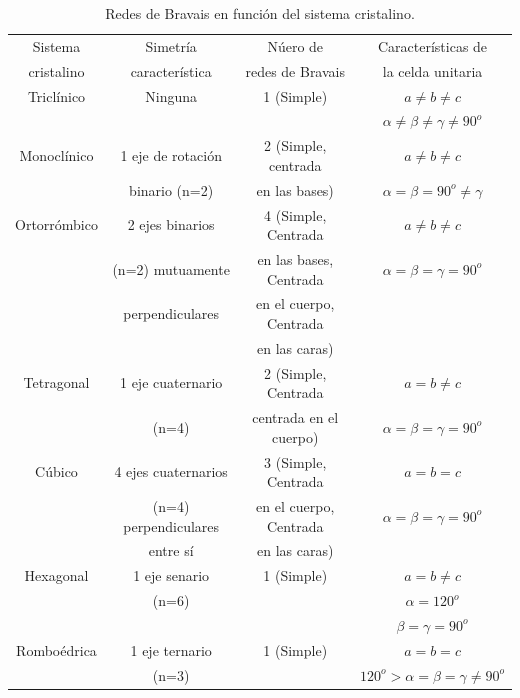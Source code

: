 \begin{table}[h!] \centering
    \begin{tabular}{cccc}
        Sistema  & Simetría  & Núero de & Características de \\ 
        cristalino & característica & redes de Bravais & la celda unitaria \\
        \hline \hline 
        Triclínico & Ninguna & 1 (Simple) & $a \neq b \neq c$ \\
        & & & $\alpha \neq \beta \neq \gamma \neq 90^o$ \\ \hline
        Monoclínico & 1 eje de rotación & 2 (Simple, centrada & $a \neq b \neq c$ \\
        & binario (n=2) & en las bases) & $\alpha = \beta = 90^o \neq \gamma$ \\ \hline Ortorrómbico & 2 ejes binarios & 4 (Simple, Centrada & $a \neq b \neq c$ \\
        & (n=2) mutuamente & en las bases, Centrada & $ \alpha = \beta = \gamma = 90^o$ \\
        & perpendiculares & en el cuerpo, Centrada & \\
        & & en las caras) & \\ \hline
        Tetragonal  & 1 eje cuaternario & 2 (Simple, Centrada & $a=b\neq c$ \\
        & (n=4) & centrada en el cuerpo) & $ \alpha = \beta = \gamma = 90^o$ \\ \hline
        Cúbico & 4 ejes cuaternarios & 3 (Simple, Centrada & $a=b=c$ \\
        & (n=4) perpendiculares & en el cuerpo, Centrada & $ \alpha = \beta = \gamma = 90^o$ \\ 
        & entre sí & en las caras)  & \\ \hline 
        Hexagonal & 1 eje senario & 1 (Simple) & $a=b\neq c$ \\
        & (n=6) & & $\alpha=120^o$  \\
        & & & $\beta = \gamma = 90^o$ \\ \hline
        Romboédrica& 1 eje ternario & 1 (Simple) & $a=b=c$ \\ 
        & (n=3) & & $120^o > \alpha = \beta = \gamma \neq 90^o$\\ \hline
    \end{tabular}
    \caption{Redes de Bravais en función del sistema cristalino.}
    \label{Tab:01-01}
\end{table}


